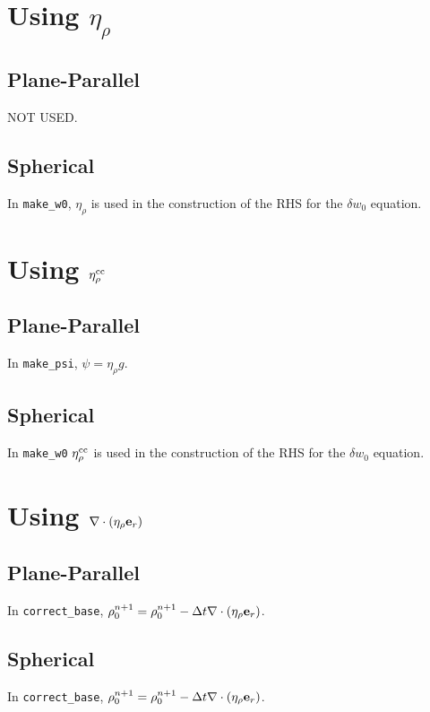 \documentclass[11pt]{article}
\def\eb         {{\bf e}}
\def\etarho     {\eta_\rho}
\def\etarhocc   {\etarho^{\rm cc}}
\def\divetarho  {\nabla\cdot(\etarho\eb_r)}
\begin{document}
\section{Using $\etarho$}
\subsection{Plane-Parallel}
NOT USED.
\subsection{Spherical}
In {\tt make\_w0}, $\etarho$ is used in the construction of the RHS for the $\delta w_0$ equation.
\section{Using $\etarhocc$}
\subsection{Plane-Parallel}
In {\tt make\_psi}, $\psi = \etarho g$.
\subsection{Spherical}
In {\tt make\_w0} $\etarhocc$ is used in the construction of the RHS for the $\delta w_0$ equation.
\section{Using $\divetarho$}
\subsection{Plane-Parallel}
In {\tt correct\_base}, $\rho_0^{n+1} = \rho_0^{n+1} - \Delta t \divetarho$.
\subsection{Spherical}
In {\tt correct\_base}, $\rho_0^{n+1} = \rho_0^{n+1} - \Delta t \divetarho$.
\end{document}

